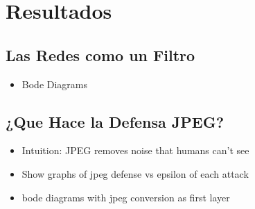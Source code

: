 \section{Resultados}
\subsection{Las Redes como un Filtro}
\begin{itemize}
    \item Bode Diagrams
\end{itemize}
\subsection{¿Que Hace la Defensa JPEG?}
\begin{itemize}
    \item Intuition: JPEG removes noise that humans can't see
    \item Show graphs of jpeg defense vs epsilon of each attack
    \item bode diagrams with jpeg conversion as first layer
\end{itemize}
